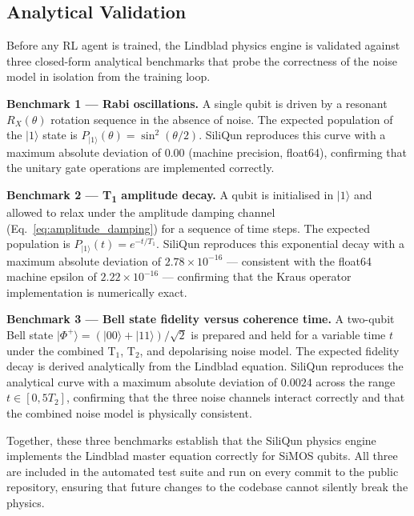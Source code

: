 \subsection{Analytical Validation}
\label{subsec:validation}

Before any RL agent is trained, the Lindblad physics engine is validated against three closed-form analytical benchmarks that probe the correctness of the noise model in isolation from the training loop.

\textbf{Benchmark 1 — Rabi oscillations.} A single qubit is driven by a resonant $R_X(\theta)$ rotation sequence in the absence of noise. The expected population of the $|1\rangle$ state is $P_{|1\rangle}(\theta) = \sin^2(\theta/2)$. SiliQun reproduces this curve with a maximum absolute deviation of $0.00$ (machine precision, float64), confirming that the unitary gate operations are implemented correctly.

\textbf{Benchmark 2 — T\textsubscript{1} amplitude decay.} A qubit is initialised in $|1\rangle$ and allowed to relax under the amplitude damping channel (Eq.~\ref{eq:amplitude_damping}) for a sequence of time steps. The expected population is $P_{|1\rangle}(t) = e^{-t/T_1}$. SiliQun reproduces this exponential decay with a maximum absolute deviation of $2.78 \times 10^{-16}$ — consistent with the float64 machine epsilon of $2.22 \times 10^{-16}$ — confirming that the Kraus operator implementation is numerically exact.

\textbf{Benchmark 3 — Bell state fidelity versus coherence time.} A two-qubit Bell state $|\Phi^+\rangle = (|00\rangle + |11\rangle)/\sqrt{2}$ is prepared and held for a variable time $t$ under the combined T$_1$, T$_2$, and depolarising noise model. The expected fidelity decay is derived analytically from the Lindblad equation. SiliQun reproduces the analytical curve with a maximum absolute deviation of $0.0024$ across the range $t \in [0, 5T_2]$, confirming that the three noise channels interact correctly and that the combined noise model is physically consistent.

Together, these three benchmarks establish that the SiliQun physics engine implements the Lindblad master equation correctly for SiMOS qubits. All three are included in the automated test suite and run on every commit to the public repository, ensuring that future changes to the codebase cannot silently break the physics.

